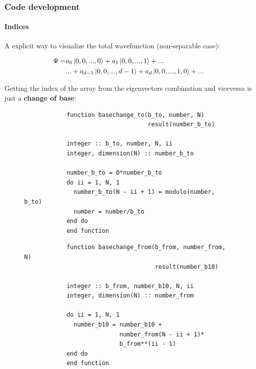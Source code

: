 \documentclass[pt12]{beamer}
\begin{document}
\begin{frame}[fragile,label=Code development]
	\frametitle{Code development}
	\framesubtitle{Indices}
	\tableofcontents[pausesections]
	A explicit way to visualize the total wavefunction (non-separable case):
	
	$$\begin{align}
	\Psi = &a_0\left|0,0,...,0\right> + a_1 \left|0,0,...,1\right> + ... \\
	     &... + a_{d-1}\left|0,0,...,d-1\right> + a_d \left|0,0,...,1,0\right>+ ...
	\end{align}$$

	Getting the index of the array from the eigenvectors combination and viceversa is just a \textbf{change of base}:
	
	\begin{multicols}{2}
		\begin{figure}[!h]\begin{verbatim}
			function basechange_to(b_to, number, N) 
			                       result(number_b_to)
			                       
			integer :: b_to, number, N, ii
			integer, dimension(N) :: number_b_to
			
			number_b_to = 0*number_b_to
			do ii = 1, N, 1
			  number_b_to(N - ii + 1) = modulo(number, b_to)
			  number = number/b_to
			end do
			end function	
			\end{verbatim}
		\end{figure}
		\columnbreak
		\begin{figure}[!h]\begin{verbatim}
			function basechange_from(b_from, number_from, N) 
			                         result(number_b10)
			                         
			integer :: b_from, number_b10, N, ii
			integer, dimension(N) :: number_from
			
			do ii = 1, N, 1
			  number_b10 = number_b10 + 
			               number_from(N - ii + 1)*
			               b_from**(ii - 1)
			end do
			end function
			\end{verbatim}
		\end{figure}
	\end{multicols}
\end{frame}
\end{document}
